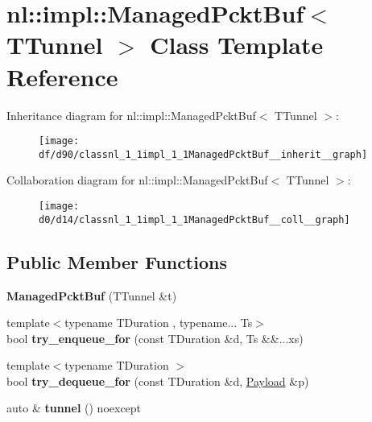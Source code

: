 \hypertarget{classnl_1_1impl_1_1ManagedPcktBuf}{}\section{nl\+:\+:impl\+:\+:Managed\+Pckt\+Buf$<$ T\+Tunnel $>$ Class Template Reference}
\label{classnl_1_1impl_1_1ManagedPcktBuf}


Inheritance diagram for nl\+:\+:impl\+:\+:Managed\+Pckt\+Buf$<$ T\+Tunnel $>$\+:\nopagebreak
\begin{figure}[H]
\begin{center}
\leavevmode
\texttt{[image: df/d90/classnl\_1\_1impl\_1\_1ManagedPcktBuf\_\_inherit\_\_graph]}
\end{center}
\end{figure}


Collaboration diagram for nl\+:\+:impl\+:\+:Managed\+Pckt\+Buf$<$ T\+Tunnel $>$\+:\nopagebreak
\begin{figure}[H]
\begin{center}
\leavevmode
\texttt{[image: d0/d14/classnl\_1\_1impl\_1\_1ManagedPcktBuf\_\_coll\_\_graph]}
\end{center}
\end{figure}
\subsection*{Public Member Functions}
\begin{DoxyCompactItemize}
\item 
\hypertarget{classnl_1_1impl_1_1ManagedPcktBuf_a26972960cfcd62151dd87f246b960dfd}{}{\bfseries Managed\+Pckt\+Buf} (T\+Tunnel \&t)\label{classnl_1_1impl_1_1ManagedPcktBuf_a26972960cfcd62151dd87f246b960dfd}

\item 
\hypertarget{classnl_1_1impl_1_1ManagedPcktBuf_a2bf2f583f806a1d0ee3946d6c75353ef}{}{\footnotesize template$<$typename T\+Duration , typename... Ts$>$ }\\bool {\bfseries try\+\_\+enqueue\+\_\+for} (const T\+Duration \&d, Ts \&\&...xs)\label{classnl_1_1impl_1_1ManagedPcktBuf_a2bf2f583f806a1d0ee3946d6c75353ef}

\item 
\hypertarget{classnl_1_1impl_1_1ManagedPcktBuf_ad6c6576b99b53107ebb548a907610178}{}{\footnotesize template$<$typename T\+Duration $>$ }\\bool {\bfseries try\+\_\+dequeue\+\_\+for} (const T\+Duration \&d, \hyperlink{structnl_1_1Payload}{Payload} \&p)\label{classnl_1_1impl_1_1ManagedPcktBuf_ad6c6576b99b53107ebb548a907610178}

\item 
\hypertarget{classnl_1_1impl_1_1ManagedPcktBuf_a3cd3f076d0729eb11e74b26401822cee}{}auto \& {\bfseries tunnel} () noexcept\label{classnl_1_1impl_1_1ManagedPcktBuf_a3cd3f076d0729eb11e74b26401822cee}

\end{DoxyCompactItemize}
